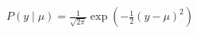 \documentclass[preview]{standalone}
\begin{document}
\begin{align*}
P(y \mid \mu)=\frac{1}{\sqrt{2 \pi}} \exp (-\frac{1}{2}(y-\mu)^2)
\end{align*}
\end{document}
